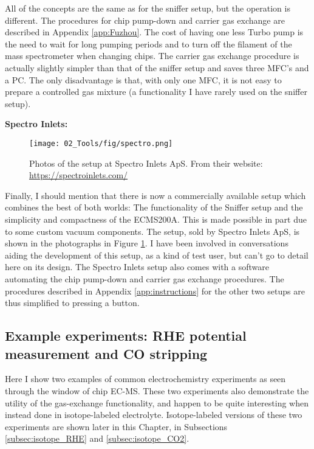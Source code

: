 All of the concepts are the same as for the sniffer setup, but the operation is different. The procedures for chip pump-down and carrier gas exchange are described in Appendix \ref{app:Fuzhou}. The cost of having one less Turbo pump is the need to wait for long pumping periods and to turn off the filament of the mass spectrometer when changing chips. The carrier gas exchange procedure is actually slightly simpler than that of the sniffer setup and saves three MFC's and a PC. The only disadvantage is that, with only one MFC, it is not easy to prepare a controlled gas mixture (a functionality I have rarely used on the sniffer setup).

\vspace{1cm}
\textbf{\large Spectro Inlets:}

\begin{figure}[h!]
	\centering
	\texttt{[image: 02\_Tools/fig/spectro.png]}
	\caption{Photos of the setup at Spectro Inlets ApS. From their website: \url{https://spectroinlets.com/}}
	\label{fig:spectro}
\end{figure}
Finally, I should mention that there is now a commercially available setup which combines the best of both worlds: The functionality of the Sniffer setup and the simplicity and compactness of the ECMS200A. This is made possible in part due to some custom vacuum components. The setup, sold by Spectro Inlets ApS, is shown in the photographs in Figure \ref{fig:spectro}. I have been involved in conversations aiding the development of this setup, as a kind of test user, but can't go to detail here on its design. The Spectro Inlets setup also comes with a software automating the chip pump-down and carrier gas exchange procedures. The procedures described in Appendix \ref{app:instructions} for the other two setups are thus simplified to pressing a button.


\subsection{Example experiments: RHE potential measurement and CO stripping}\label{subsec:examples}
Here I show two examples of common electrochemistry experiments as seen through the window of chip EC-MS. These two experiments also demonstrate the utility of the gas-exchange functionality, and happen to be quite interesting when instead done in isotope-labeled electrolyte. Isotope-labeled versions of these two experiments are shown later in this Chapter, in Subsections \ref{subsec:isotope_RHE} and \ref{subsec:isotope_CO2}.

